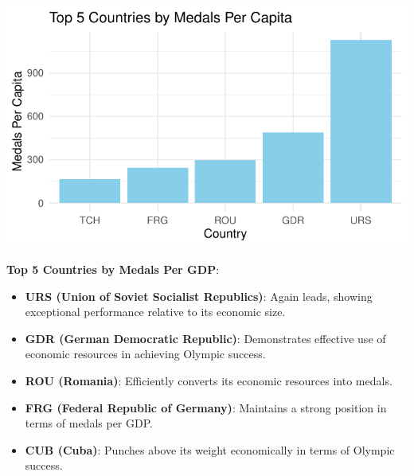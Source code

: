 \documentclass[12pt,preprint, authoryear]{elsarticle}
\let\origfigure\figure
\let\endorigfigure\endfigure
\renewenvironment{figure}[1][2] {
    \expandafter\origfigure\expandafter[H]
} {
    \endorigfigure
}
\numberwithin{equation}{section}
\numberwithin{figure}{section}
\numberwithin{table}{section}
\begin{document}
\begin{figure}

{\centering \includegraphics{README_files/figure-latex/unnamed-chunk-2-1} 

}

\caption{The Top Countries that Dominate Winning Medals Per Capita\label{Figure2}}\label{fig:unnamed-chunk-2}
\end{figure}

\textbf{Top 5 Countries by Medals Per GDP}:

\begin{itemize}
\item
  \textbf{URS (Union of Soviet Socialist Republics)}: Again leads,
  showing exceptional performance relative to its economic size.
\item
  \textbf{GDR (German Democratic Republic)}: Demonstrates effective use
  of economic resources in achieving Olympic success.
\item
  \textbf{ROU (Romania)}: Efficiently converts its economic resources
  into medals.
\item
  \textbf{FRG (Federal Republic of Germany)}: Maintains a strong
  position in terms of medals per GDP.
\item
  \textbf{CUB (Cuba)}: Punches above its weight economically in terms of
  Olympic success.
\end{itemize}
\end{document}
